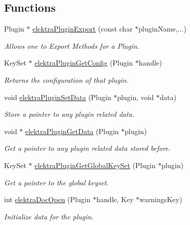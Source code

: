\subsection*{Functions}
\begin{DoxyCompactItemize}
\item 
Plugin $\ast$ \hyperlink{group__plugin_ga8dd092048e972a3f0c9c9f54eb41576e}{elektra\+Plugin\+Export} (const char $\ast$plugin\+Name,...)
\begin{DoxyCompactList}\small\item\em Allows one to Export Methods for a Plugin. \end{DoxyCompactList}\item 
Key\+Set $\ast$ \hyperlink{group__plugin_ga644bead796506c172817724051c977c9}{elektra\+Plugin\+Get\+Config} (Plugin $\ast$handle)
\begin{DoxyCompactList}\small\item\em Returns the configuration of that plugin. \end{DoxyCompactList}\item 
void \hyperlink{group__plugin_gaf4b941a52ff55d0ca2a9158d90208ef2}{elektra\+Plugin\+Set\+Data} (Plugin $\ast$plugin, void $\ast$data)
\begin{DoxyCompactList}\small\item\em Store a pointer to any plugin related data. \end{DoxyCompactList}\item 
void $\ast$ \hyperlink{group__plugin_gaafcf3216b46292f222b8cc7828b4dd20}{elektra\+Plugin\+Get\+Data} (Plugin $\ast$plugin)
\begin{DoxyCompactList}\small\item\em Get a pointer to any plugin related data stored before. \end{DoxyCompactList}\item 
Key\+Set $\ast$ \hyperlink{group__plugin_ga436cda13ed70c0face08661a90620bf6}{elektra\+Plugin\+Get\+Global\+Key\+Set} (Plugin $\ast$plugin)
\begin{DoxyCompactList}\small\item\em Get a pointer to the global keyset. \end{DoxyCompactList}\item 
int \hyperlink{group__plugin_ga23c2eb3584e38a4d494eb8f91e5e3d8d}{elektra\+Doc\+Open} (Plugin $\ast$handle, Key $\ast$warnings\+Key)
\begin{DoxyCompactList}\small\item\em Initialize data for the plugin. \end{DoxyCompactList}\item 

\end{DoxyCompactItemize}
